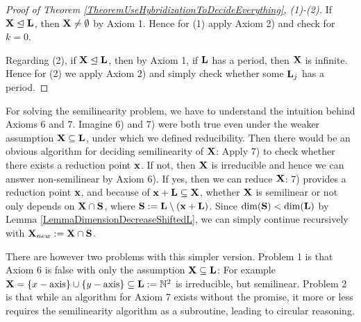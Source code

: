 \begin{proof}[Proof of Theorem \ref{TheoremUseHybridizationToDecideEverything}, (1)-(2)]
If \(\mathbf{X} \trianglelefteq \mathbf{L}\), then \(\mathbf{X} \neq \emptyset\) by Axiom 1. Hence for (1) apply Axiom 2) and check for \(k=0\). 

Regarding (2), if \(\mathbf{X} \trianglelefteq \mathbf{L}\), then by Axiom 1, if \(\mathbf{L}\) has a period, then \(\mathbf{X}\) is infinite. Hence for (2) we apply Axiom 2) and simply check whether some \(\mathbf{L}_j\) has a period.
\end{proof}

%
%

For solving the semilinearity problem, we have to understand the intuition behind Axioms 6 and 7. Imagine 6) and 7) were both true even under the weaker assumption \(\mathbf{X} \subseteq \mathbf{L}\), under which we defined reducibility. Then there would be an obvious algorithm for deciding semilinearity of \(\mathbf{X}\): Apply 7) to check whether there exists a reduction point \(\mathbf{x}\). If not, then \(\mathbf{X}\) is irreducible and hence we can answer non-semilinear by Axiom 6). If yes, then we can reduce \(\mathbf{X}\): 7) provides a reduction point \(\mathbf{x}\), and because of \(\mathbf{x}+\mathbf{L} \subseteq \mathbf{X}\), whether \(\mathbf{X}\) is semilinear or not only depends on \(\mathbf{X} \cap \mathbf{S}\), where \(\mathbf{S}:=\mathbf{L} \setminus (\mathbf{x}+\mathbf{L})\). Since \(\dim(\mathbf{S}) < \dim(\mathbf{L})\) by Lemma \ref{LemmaDimensionDecreaseShiftedL}, we can simply continue recursively with \(\mathbf{X}_{new}:=\mathbf{X} \cap \mathbf{S}\).

There are however two problems with this simpler version. Problem 1 is that Axiom 6 is false with only the assumption \(\mathbf{X} \subseteq \mathbf{L}\): For example \(\mathbf{X}=\{x-\text{axis}\} \cup \{y-\text{axis}\} \subseteq \mathbf{L}:=\mathbb{N}^2\) is irreducible, but semilinear. Problem 2 is that while an algorithm for Axiom 7 exists without the promise, it more or less requires the semilinearity algorithm as a subroutine, leading to circular reasoning.

